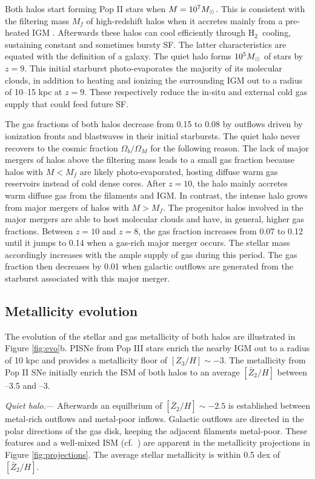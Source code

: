\documentclass[12pt]{article}
\newcommand{\hh}{H$_2$}
\newcommand{\Ms}{\ifmmode{M_\odot}\else{$M_\odot$}\fi}
\begin{document}
Both halos start forming Pop II stars when $M = 10^7 \Ms$.  This is
consistent with the filtering mass $M_f$ of high-redshift halos when
it accretes mainly from a pre-heated IGM \cite{gnedin98, gnedin00,
  Wise08_Gal}.  Afterwards these halos can cool efficiently through
\hh~cooling, sustaining constant and sometimes bursty SF.  The latter
characteristics are equated with the definition of a galaxy.  The
quiet halo forms $10^5 \Ms$ of stars by $z=9$.  This initial starburst
photo-evaporates the majority of its molecular clouds, in addition to
heating and ionizing the surrounding IGM out to a radius of 10--15 kpc
at $z=9$.  These respectively reduce the in-situ and external cold gas
supply that could feed future SF.

The gas fractions of both halos decrease from 0.15 to 0.08 by outflows
driven by ionization fronts and blastwaves in their initial
starbursts.  The quiet halo never recovers to the cosmic fraction
$\Omega_b/\Omega_M$ for the following reason.  The lack of major
mergers of halos above the filtering mass leads to a small gas
fraction because halos with $M < M_f$ are likely photo-evaporated,
hosting diffuse warm gas reservoirs instead of cold dense cores.
After $z=10$, the halo mainly accretes warm diffuse gas from the
filaments and IGM.  In contrast, the intense halo grows from major
mergers of halos with $M > M_f$.  The progenitor halos involved in the
major mergers are able to host molecular clouds and have, in general,
higher gas fractions.  Between $z=10$ and $z=8$, the gas fraction
increases from 0.07 to 0.12 until it jumps to 0.14 when a gas-rich
major merger occurs.  The stellar mass accordingly increases with the
ample supply of gas during this period.  The gas fraction then
decreases by 0.01 when galactic outflows are generated from the
starburst associated with this major merger.

\subsection*{Metallicity evolution}
\label{sec:zevo}

The evolution of the stellar and gas metallicity of both halos are
illustrated in Figure \ref{fig:evo}b.  PISNe from Pop III stars enrich
the nearby IGM out to a radius of 10 kpc and provides a metallicity
floor of $[Z_3/H] \sim -3$.  The metallicity from Pop II SNe initially
enrich the ISM of both halos to an average $[\bar{Z}_2/H]$ between
--3.5 and --3.  

\textit{Quiet halo}.--- Afterwards an equilbrium of $[\bar{Z}_2/H]
\sim -2.5$ is established between metal-rich outflows and metal-poor
inflows.  Galactic outflows are directed in the polar directions of
the gas disk, keeping the adjacent filaments metal-poor.  These
features and a well-mixed ISM (cf.~\cite{Wise08_Gal, Greif10}) are
apparent in the metallicity projections in Figure
\ref{fig:projections}.  The average stellar metallicity is within 0.5
dex of $[\bar{Z}_2/H]$.
\end{document}
